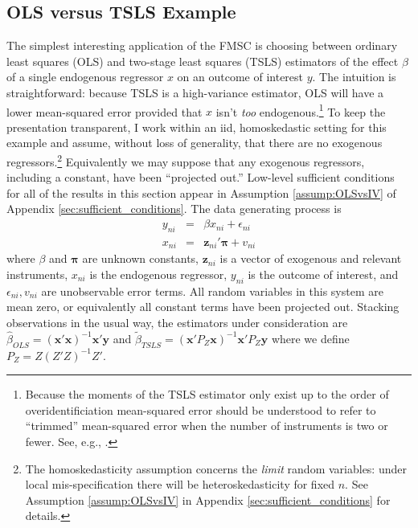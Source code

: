 \subsection{OLS versus TSLS Example}
\label{sec:OLSvsIVExample}
The simplest interesting application of the FMSC is choosing between ordinary least squares (OLS) and two-stage least squares (TSLS) estimators of the effect $\beta$ of a single endogenous regressor $x$ on an outcome of interest $y$.
The intuition is straightforward: because TSLS is a high-variance estimator, OLS will have a lower mean-squared error provided that $x$ isn't \emph{too} endogenous.\footnote{Because the moments of the TSLS estimator only exist up to the order of overidentificiation \citep{Phillips1980} mean-squared error should be understood to refer to ``trimmed'' mean-squared error when the number of instruments is two or fewer. See, e.g., \cite{Hansen2013}.}
To keep the presentation transparent, I work within an iid, homoskedastic setting for this example and assume, without loss of generality, that there are no exogenous regressors.\footnote{The homoskedasticity assumption concerns the \emph{limit} random variables: under local mis-specification there will be heteroskedasticity for fixed $n$. See Assumption \ref{assump:OLSvsIV} in Appendix \ref{sec:sufficient_conditions} for details.}
Equivalently we may suppose that any exogenous regressors, including a constant, have been ``projected out.''
Low-level sufficient conditions for all of the results in this section appear in Assumption \ref{assump:OLSvsIV} of Appendix \ref{sec:sufficient_conditions}.
The data generating process is
    \begin{eqnarray}
			y_{ni} &=& \beta x_{ni}  + \epsilon_{ni}\\
	x_{ni} &=& \mathbf{z}_{ni}' \boldsymbol{\pi} + v_{ni}
	\end{eqnarray}
where $\beta$ and $\boldsymbol{\pi}$ are unknown constants, $\mathbf{z}_{ni}$ is a vector of exogenous and relevant instruments, $x_{ni}$ is the endogenous regressor, $y_{ni}$ is the outcome of interest, and $\epsilon_{ni}, v_{ni}$ are unobservable error terms.
All random variables in this system are mean zero, or equivalently all constant terms have been projected out. 
Stacking observations in the usual way, the estimators under consideration are $\widehat{\beta}_{OLS} = \left(\mathbf{x}'\mathbf{x}\right)^{-1}\mathbf{x}'\mathbf{y}$ and
$\widetilde{\beta}_{TSLS} = \left(\mathbf{x}'P_Z\mathbf{x}\right)^{-1}\mathbf{x}'P_Z\mathbf{y}$ where we define $P_Z = Z(Z'Z)^{-1}Z'$. 


